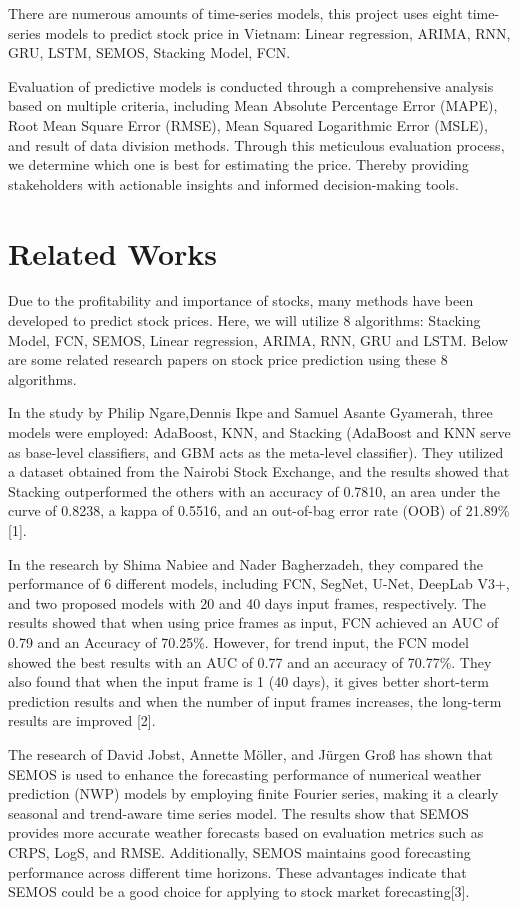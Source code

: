 \documentclass{ieeeojies}
\begin{document}
There are numerous amounts of time-series models, this project uses eight time-series models to predict stock price in Vietnam: Linear regression, ARIMA, RNN, GRU, LSTM, SEMOS, Stacking Model, FCN.

Evaluation of predictive models is conducted through a comprehensive analysis based on multiple criteria, including Mean Absolute Percentage Error (MAPE), Root Mean Square Error (RMSE), Mean Squared Logarithmic Error (MSLE), and result of data division methods. Through this meticulous evaluation process, we determine which one is best for estimating the price. Thereby providing stakeholders with actionable insights and informed decision-making tools.

\section{Related Works}

Due to the profitability and importance of stocks, many methods have been developed to predict stock prices. Here, we will utilize 8 algorithms: Stacking Model, FCN, SEMOS, Linear regression, ARIMA, RNN, GRU and LSTM. Below are some related research papers on stock price prediction using these 8 algorithms. 

In the study by Philip Ngare,Dennis Ikpe and Samuel Asante Gyamerah, three models were employed: AdaBoost, KNN, and Stacking (AdaBoost and KNN serve as base-level classifiers, and GBM acts as the meta-level classifier). They utilized a dataset obtained from the Nairobi Stock Exchange, and the results showed that Stacking outperformed the others with an accuracy of 0.7810, an area under the curve of 0.8238, a kappa of 0.5516, and an out-of-bag error rate (OOB) of 21.89\% [1]. 

In the research by Shima Nabiee and Nader Bagherzadeh, they compared the performance of 6 different models, including FCN, SegNet, U-Net, DeepLab V3+, and two proposed models with 20 and 40 days input frames, respectively. The results showed that when using price frames as input, FCN achieved an AUC of 0.79 and an Accuracy of 70.25\%. However, for trend input, the FCN model showed the best results with an AUC of 0.77 and an accuracy of 70.77\%. They also found that when the input frame is 1 (40 days), it gives better short-term prediction results and when the number of input frames increases, the long-term results are improved [2].

The research of David Jobst, Annette Möller, and Jürgen Groß has shown that  SEMOS is used to enhance the forecasting performance of numerical weather prediction (NWP) models by employing finite Fourier series, making it a clearly seasonal and trend-aware time series model. The results show that SEMOS provides more accurate weather forecasts based on evaluation metrics such as CRPS, LogS, and RMSE. Additionally, SEMOS maintains good forecasting performance across different time horizons. These advantages indicate that SEMOS could be a good choice for applying to stock market forecasting[3].
\end{document}
